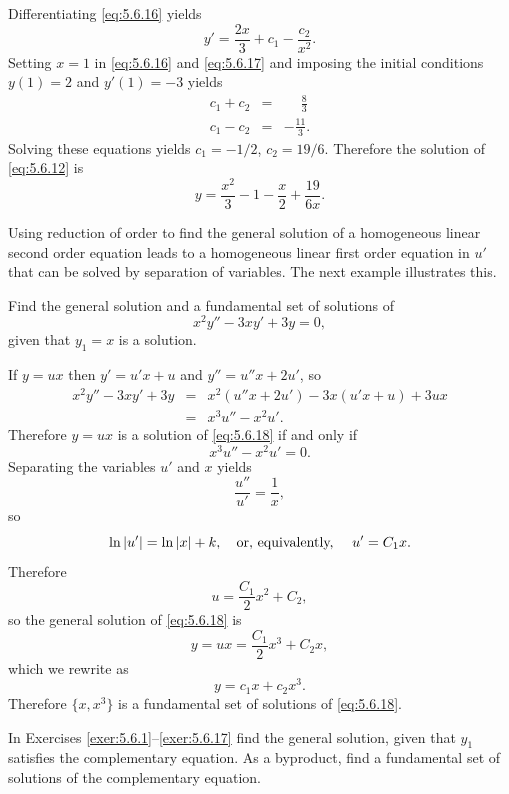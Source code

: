 \begin{examplesolution}
 Differentiating \eqref{eq:5.6.16} yields
\begin{equation}
  \label{eq:5.6.17}y'=\frac{2x}{3}+c_{1}-\frac{c_{2}}{x^{2}}.
\end{equation}
Setting $x=1$ in \eqref{eq:5.6.16} and \eqref{eq:5.6.17} and imposing the initial conditions
$y(1)=2$ and $y'(1)=-3$ yields
\begin{eqnarray*}
  c_{1}+c_{2} & = & \phantom{-}{\frac{8}{3}} \\
  c_{1}-c_{2} & = & -\frac{11}{3}.
\end{eqnarray*}
Solving these equations yields $c_{1}=-1/2$, $c_{2}=19/6$. Therefore the solution of
\eqref{eq:5.6.12} is
\[
  y=\frac{x^{2}}{3}-1-\frac{x}{2}+\frac{19}{6x}.
\]
\end{examplesolution}

Using reduction of order to find the general solution of a homogeneous linear second order equation
leads to a homogeneous linear first order equation in $u'$ that can be solved by separation of
variables. The next example illustrates this.

\begin{example}
  \label{example:5.6.3} \rm Find the general solution and a fundamental set of solutions of
  \begin{equation}
    \label{eq:5.6.18}x^{2}y''-3xy'+3y=0,
  \end{equation}
  given that $y_{1}=x$ is a solution.
\end{example}

\begin{examplesolution}
\solution If $y=ux$ then $y'=u'x+u$ and $y''=u''x+2u'$, so
\begin{eqnarray*}
  x^{2}y''-3xy'+3y & = & x^{2}(u''x+2u')-3x(u'x+u)+3ux \\
                   & = & x^{3}u''-x^{2}u'.
\end{eqnarray*}
Therefore $y=ux$ is a solution of \eqref{eq:5.6.18} if and only if
\[
  x^{3}u''-x^{2}u'=0.
\]
Separating the variables $u'$ and $x$ yields
\[
  \frac{u''}{u'}=\frac{1}{x},
\]
so
\[
  \ln|u'|=\ln|x|+k,\mbox{\quad or, equivalently, \quad}u'=C_{1}x.
\]
Therefore
\[
  u=\frac{C_{1}}{2}x^{2}+C_{2},
\]
so the general solution of \eqref{eq:5.6.18} is
\[
  y=ux=\frac{C_{1}}{2}x^{3}+C_{2}x,
\]
which we rewrite as
\[
  y=c_{1}x+c_{2}x^{3}.
\]
Therefore $\{x,x^{3}\}$ is a fundamental set of solutions of \eqref{eq:5.6.18}.
\end{examplesolution}

\exercises In Exercises \ref{exer:5.6.1}--\ref{exer:5.6.17} find the general solution, given that $y_{1}$ satisfies the complementary equation. As a byproduct, find a fundamental set of solutions of the complementary equation.

